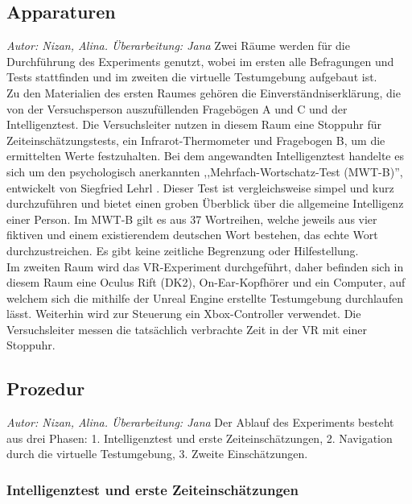 \documentclass{Paper}
\begin{document}
        \subsection{Apparaturen}
                \textit{Autor: Nizan, Alina. Überarbeitung: Jana}
Zwei Räume werden für die Durchführung des Experiments genutzt, wobei im ersten alle Befragungen und Tests stattfinden und im zweiten die virtuelle Testumgebung aufgebaut ist.\\
Zu den Materialien des ersten Raumes gehören die Einverständniserklärung, die von der Versuchsperson auszufüllenden Fragebögen A und C und der Intelligenztest.
Die Versuchsleiter nutzen in diesem Raum eine Stoppuhr für Zeiteinschätzungstests, ein Infrarot-Thermometer und Fragebogen B, um die ermittelten Werte festzuhalten.
Bei dem angewandten Intelligenztest handelte es sich um den psychologisch anerkannten ,,Mehrfach-Wortschatz-Test (MWT-B)'', entwickelt von Siegfried Lehrl \cite{MWT-B}. Dieser Test ist vergleichsweise simpel und kurz durchzuführen und bietet einen groben Überblick über die allgemeine Intelligenz einer Person. 
Im MWT-B gilt es aus 37 Wortreihen, welche jeweils aus vier fiktiven und einem existierendem deutschen Wort bestehen, das echte Wort durchzustreichen. Es gibt keine zeitliche Begrenzung oder Hilfestellung.\\
Im zweiten Raum wird das VR-Experiment durchgeführt, daher befinden sich in diesem Raum eine Oculus Rift (DK2), On-Ear-Kopfhörer und ein Computer, auf welchem sich die mithilfe der Unreal Engine erstellte Testumgebung durchlaufen lässt. Weiterhin wird zur Steuerung ein Xbox-Controller verwendet. Die Versuchsleiter messen die tatsächlich verbrachte Zeit in der VR mit einer Stoppuhr.
\subsection{Prozedur}
        \textit{Autor: Nizan, Alina. Überarbeitung: Jana}
Der Ablauf des Experiments besteht aus drei Phasen: 1. Intelligenztest und erste Zeiteinschätzungen, 2. Navigation durch die virtuelle Testumgebung, 3. Zweite Einschätzungen.
\subsubsection{Intelligenztest und erste Zeiteinschätzungen}
\end{document}
